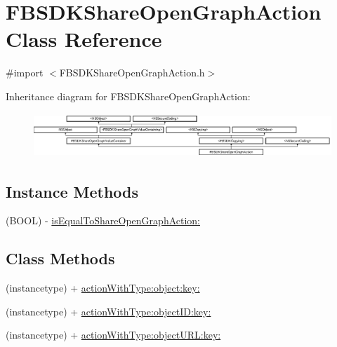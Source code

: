 \hypertarget{interface_f_b_s_d_k_share_open_graph_action}{}\section{F\+B\+S\+D\+K\+Share\+Open\+Graph\+Action Class Reference}
\label{interface_f_b_s_d_k_share_open_graph_action}


{\ttfamily \#import $<$F\+B\+S\+D\+K\+Share\+Open\+Graph\+Action.\+h$>$}

Inheritance diagram for F\+B\+S\+D\+K\+Share\+Open\+Graph\+Action\+:\begin{figure}[H]
\begin{center}
\leavevmode
\includegraphics[height=1.671642cm]{interface_f_b_s_d_k_share_open_graph_action}
\end{center}
\end{figure}
\subsection*{Instance Methods}
\begin{DoxyCompactItemize}
\item 
(B\+O\+O\+L) -\/ \hyperlink{interface_f_b_s_d_k_share_open_graph_action_a5927f05c6d91d933508f7b9ce73d3edf}{is\+Equal\+To\+Share\+Open\+Graph\+Action\+:}
\end{DoxyCompactItemize}
\subsection*{Class Methods}
\begin{DoxyCompactItemize}
\item 
(instancetype) + \hyperlink{interface_f_b_s_d_k_share_open_graph_action_ad1563adbca5b35071c7605db39881d03}{action\+With\+Type\+:object\+:key\+:}
\item 
(instancetype) + \hyperlink{interface_f_b_s_d_k_share_open_graph_action_ab6a9ba11f94fa3d7e6e7632d6d36e068}{action\+With\+Type\+:object\+I\+D\+:key\+:}
\item 
(instancetype) + \hyperlink{interface_f_b_s_d_k_share_open_graph_action_a9519ca50317dad9cfa84160714051630}{action\+With\+Type\+:object\+U\+R\+L\+:key\+:}
\end{DoxyCompactItemize}
